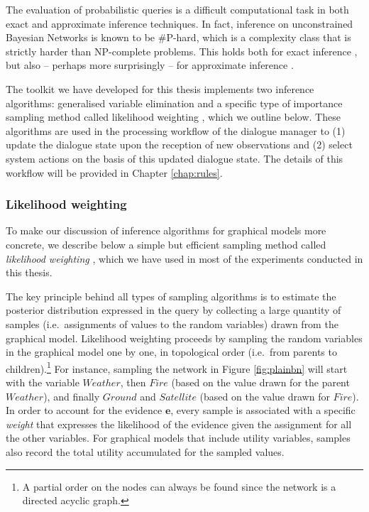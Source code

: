 The evaluation of probabilistic queries is a difficult computational task in both exact and approximate inference techniques.  In fact, inference on unconstrained Bayesian Networks is known to be {\#}P-hard, which is a complexity class that is strictly harder than NP-complete problems.  This holds both for exact inference \citep{Cooper90}, but also -- perhaps more surprisingly -- for approximate inference \citep{Dagum1993}.  


The \opendial{} toolkit we have developed for this thesis implements two inference algorithms: generalised variable elimination \citep[][p. 1103]{Koller+Friedman:09} and a specific type of importance sampling method called likelihood weighting \citep{FungC89}, which we outline below. These algorithms are used in the processing workflow of the dialogue manager to (1) update the dialogue state upon the reception of new observations and (2) select system actions on the basis of this updated dialogue state. The details of this workflow will be provided in Chapter \ref{chap:rules}.  

\subsubsection*{Likelihood weighting} 

To make our discussion of inference algorithms for graphical models more concrete, we describe below a simple but efficient sampling method called \textit{likelihood weighting} \citep{FungC89}, which we have used in most of the experiments conducted in this thesis.  

The key principle behind all types of sampling algorithms is to estimate the posterior distribution expressed in the query by collecting a large quantity of samples (i.e.\ assignments of values to the random variables) drawn from the graphical model.  Likelihood weighting proceeds by sampling the random variables in the graphical model one by one, in topological order (i.e.\ from parents to children).\footnote{A partial order on the nodes  can always be found since the network is a directed acyclic graph.} For instance, sampling the network in Figure \ref{fig:plainbn} will start with the variable $\mathit{Weather}$, then $\mathit{Fire}$ (based on the value drawn for the parent $\mathit{Weather}$), and finally $\mathit{Ground}$ and $\mathit{Satellite}$ (based on the value drawn for $\mathit{Fire}$).  In order to account for the evidence $\mathbf{e}$, every sample is associated with a specific \textit{weight} that expresses the likelihood of the evidence given the assignment for all the other variables.  For graphical models that include utility variables, samples also record the total utility accumulated for the sampled values. 

